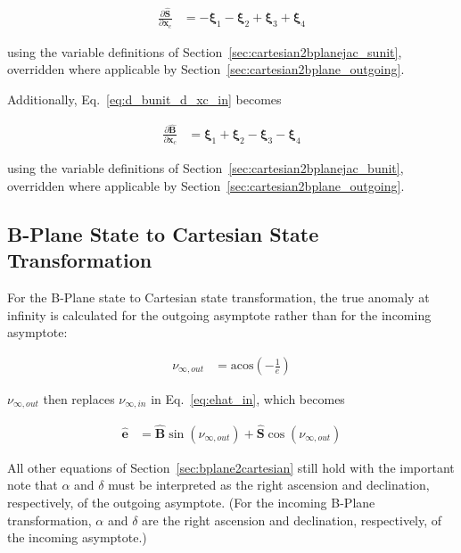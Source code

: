 \documentclass[]{article}
\newcommand{\vb}[1]{\bm{#1}} %
\newcommand{\vbh}[1]{\hat{\bm{#1}}} %
\newcommand{\pd}[2]{\frac{\partial #1}{\partial #2}} %
\newcommand{\xc}[0]{\vb{x}_c}
\begin{document}
\begin{align}
	\pd{\vbh{S}}{\xc} &= -\vb{\xi}_1 - \vb{\xi}_2 + \vb{\xi}_3 + \vb{\xi}_4
\end{align}

\noindent using the variable definitions of Section~\ref{sec:cartesian2bplanejac_sunit}, overridden where applicable by Section~\ref{sec:cartesian2bplane_outgoing}.

Additionally, Eq.~\eqref{eq:d_bunit_d_xc_in} becomes

\begin{align}
	\pd{\vbh{B}}{\xc} &= \vb{\xi}_1 + \vb{\xi}_2 - \vb{\xi}_3 - \vb{\xi}_4
\end{align}

\noindent using the variable definitions of Section~\ref{sec:cartesian2bplanejac_bunit}, overridden where applicable by Section~\ref{sec:cartesian2bplane_outgoing}.

\subsection{B-Plane State to Cartesian State Transformation}
\label{sec:bplane2cartesian_outgoing}

For the B-Plane state to Cartesian state transformation, the true anomaly at infinity is calculated for the outgoing asymptote rather than for the incoming asymptote:

\begin{align}
	\nu_{\infty, out} &= \mathrm{acos} \left(-\frac{1}{e} \right)
\end{align}

\noindent $\nu_{\infty, out}$ then replaces $\nu_{\infty, in}$ in Eq.~\eqref{eq:ehat_in}, which becomes

\begin{align}
	\vbh{e} &= \vbh{B} \sin \left( \nu_{\infty, out} \right) + \vbh{S} \cos \left( \nu_{\infty, out} \right)
\end{align}

All other equations of Section~\ref{sec:bplane2cartesian} still hold with the important note that $\alpha$ and $\delta$ must be interpreted as the right ascension and declination, respectively, of the outgoing asymptote. (For the incoming B-Plane transformation, $\alpha$ and $\delta$ are the right ascension and declination, respectively, of the incoming asymptote.)
\end{document}
